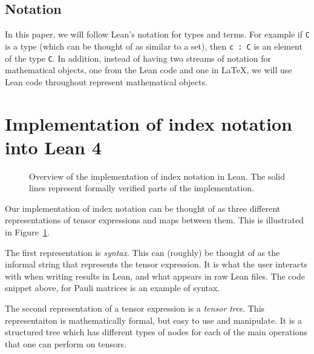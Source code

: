 \documentclass[a4paper, 11pt]{article}
\begin{document}
\subsection*{Notation}
In this paper, we will follow Lean's notation for types and terms. 
For example if \lstinline|C| is a type (which can be thought of as similar to a set),
then \lstinline|c : C| is an element of the type \lstinline|C|. 
In addition, instead of having two streams of notation for mathematical objects, one from the Lean 
code and one in LaTeX, we will use Lean code throughout represent mathematical objects.
\section{Implementation of index notation into Lean 4}\label{sec:Implementation}

\begin{figure}
  \centering
  \caption{Overview of the implementation of index notation in Lean. The 
  solid lines represent formally verified parts of the implementation.}
  \label{fig:overviewFlow}
\end{figure}

Our implementation of index notation can be thought of as three different representations of tensor 
expressions and maps between them. This is illustrated in Figure~\ref{fig:overviewFlow}.

The first representation is \emph{syntax}. This can (roughly) be thought of as the informal string
that represents the tensor expression. It is what the user interacts with when 
writing results in Lean, and what appears in raw Lean files. The code snippet above, 
for Pauli matrices is an example of syntax. 

The second representation of a tensor expression is a \emph{tensor tree}. This representaiton is 
mathematically formal, but easy to use and manipulate. 
It is a structured tree which has different types 
of nodes for each of the main operations that one can perform on tensors.
\end{document}
